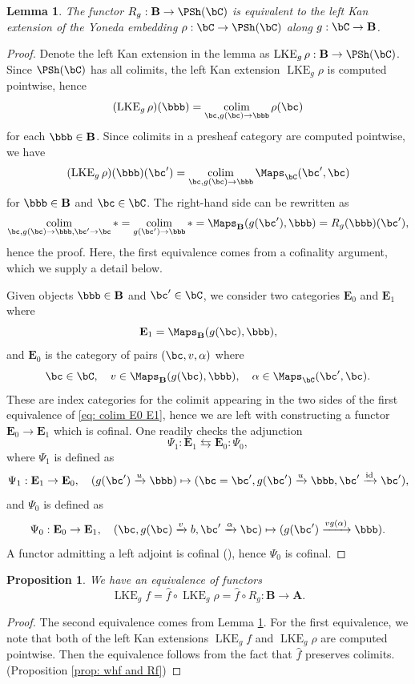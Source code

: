 \documentclass[10pt]{amsart}
\newtheorem{lemma}[subsubsection]{Lemma}
\newtheorem{prop}[subsubsection]{Proposition}
\theoremstyle{remark}
\newcommand{\wh}{\widehat}
\newcommand{\on}{\operatorname}
\DeclareMathOperator{\colim}{colim}
\newcommand{\id}{\on{id}}
\newcommand{\bA}{\mathbf{A}}
\newcommand{\bB}{\mathbf{B}}
\newcommand{\bE}{\mathbf{E}}
\begin{document}
\begin{lemma}\label{lem: Rg as a LKE}
    The functor $R_g: \bB\rightarrow \PSh(\bC)$ is equivalent to the left Kan extension of the Yoneda embedding $\rho:\bC\rightarrow\PSh(\bC)$ along $g:\bC\rightarrow\bB$.
\end{lemma}
\begin{proof}
    Denote the left Kan extension in the lemma as $\on{LKE}_g \rho: \bB\rightarrow\PSh(\bC)$. Since $\PSh(\bC)$ has all colimits, the left Kan extension $\on{LKE}_g \rho$ is computed pointwise, hence
    \[(\on{LKE}_g \rho)(\bbb)=\colim_{\bc, g(\bc)\rightarrow \bbb} \rho(\bc)\]
    for each $\bbb\in\bB$.
    Since colimits in a presheaf category are computed pointwise, we have
    \[(\on{LKE}_g \rho)(\bbb)(\bc')=\colim_{\bc, g(\bc)\rightarrow \bbb}\Maps_{\bC}(\bc',\bc)\]
    for $\bbb\in\bB$ and $\bc\in\bC$. The right-hand side can be rewritten as
    \begin{equation}\label{eq: colim E0 E1}
        \colim_{\bc, g(\bc)\rightarrow \bbb, \bc'\rightarrow \bc}\ast=\colim_{g(\bc')\rightarrow \bbb}\ast = \Maps_{\bB}(g(\bc'),\bbb)=R_g(\bbb)(\bc'),
    \end{equation}
    hence the proof.
    Here, the first equivalence comes from a cofinality argument, which we supply a detail below.
    \medskip

    Given objects $\bbb\in\bB$ and $\bc'\in\bC$, we consider two categories $\bE_0$ and $\bE_1$ where
    \[\bE_1=\Maps_{\bB}(g(\bc),\bbb),\]
    and $\bE_0$ is the category of pairs $(\bc,v,\alpha)$ where
    \[\bc\in\bC,\quad v\in\Maps_{\bB}(g(\bc),\bbb),\quad \alpha\in\Maps_{\bC}(\bc',\bc). \]   
    These are index categories for the colimit appearing in the two sides of the first equivalence of \eqref{eq: colim E0 E1}, hence we are left with constructing a functor $\bE_0\rightarrow \bE_1$ which is cofinal.
    One readily checks the adjunction
    \[\Psi_1:\bE_1\leftrightarrows \bE_0:\Psi_0,\]
    where $\Psi_1$ is defined as 
    \[\Psi_1:\bE_1\rightarrow \bE_0,\quad (g(\bc')\xrightarrow[]{u}\bbb)\mapsto (\bc=\bc', g(\bc')\xrightarrow[]{u} \bbb, \bc'\xrightarrow[]{\id}\bc'), \]
    and $\Psi_0$ is defined as
    \[\Psi_0:\bE_0\rightarrow\bE_1,\quad (\bc,g(\bc)\xrightarrow{v}b,\bc'\xrightarrow{\alpha}\bc)\mapsto (g(\bc')\xrightarrow{vg(\alpha)}\bbb).\]
    A functor admitting a left adjoint is cofinal (\cite[Ch.1 Sect. 2.2.3]{GR}), hence $\Psi_0$ is cofinal.
\end{proof}

\begin{prop}\label{prop: decompose LKE}
    We have an equivalence of functors
    \[\on{LKE}_g f=
    \wh{f}\circ \on{LKE}_g \rho=\wh{f}\circ R_g: \bB\rightarrow \bA.\]
\end{prop}
\begin{proof}
    The second equivalence comes from Lemma \ref{lem: Rg as a LKE}. For the first equivalence, we note that both of the left Kan extensions $\on{LKE}_g f$ and $\on{LKE}_g \rho$ are computed pointwise. Then the equivalence follows from the fact that $\wh{f}$ preserves colimits. (Proposition \ref{prop: whf and Rf}) 
\end{proof}
\end{document}

